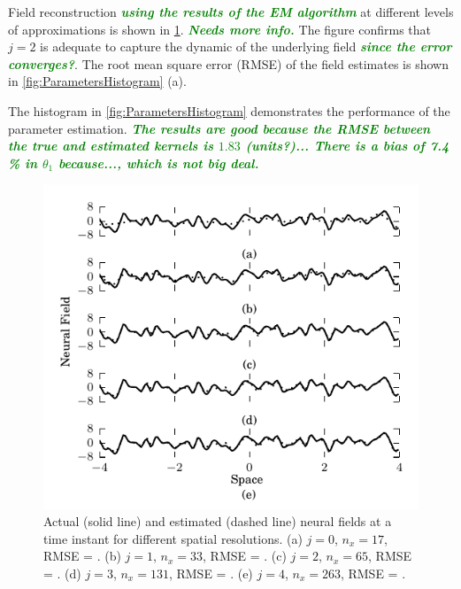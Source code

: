 \documentclass[journal,a4paper]{IEEEtran}
\newcommand{\dean}[1]{\textsf{\emph{\textbf{\textcolor{green}{#1}}}}}
\begin{document}
Field reconstruction \dean{using the results of the EM algorithm} at different levels of approximations is shown in \figurename{\ref{fig:FieldEstimates}}. \dean{Needs more info.} The figure confirms that $j=2$ is adequate to capture the dynamic of the underlying field \dean{since the error converges?}. The root mean square error (RMSE) of the field estimates is shown in \figurename{\ref{fig:ParametersHistogram}} (a). 

The histogram in \figurename{\ref{fig:ParametersHistogram}} demonstrates the performance of the parameter estimation. \dean{The results are good because the RMSE between the true and estimated kernels is $1.83$ (units?)... There is a bias of 7.4 \% in $\theta_1$ because..., which is not big deal.}
\begin{figure}[!h] 
 \centering
 \includegraphics[scale=0.9]{./Graph/Field.pdf}
 \caption{Actual (solid line) and estimated (dashed line) neural fields at a time instant for different spatial resolutions. (a) $j=0$, $n_x=17$, RMSE = . (b) $j=1$, $n_x=33$, RMSE = . (c) $j=2$, $n_x=65$, RMSE = . (d) $j=3$, $n_x=131$, RMSE = . (e) $j=4$, $n_x=263$, RMSE = .}
 \label{fig:FieldEstimates}
 \end{figure} 
\end{document}
